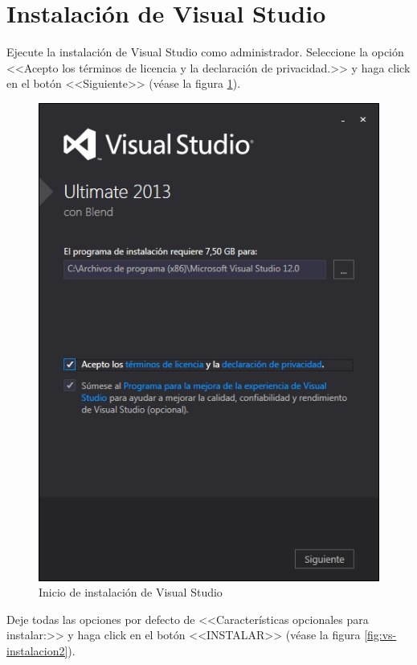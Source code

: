 \newpage

\section{Instalaci\'{o}n de Visual Studio}
	
Ejecute la instalaci\'{o}n de Visual Studio como administrador. Seleccione la opci\'{o}n <<Acepto los t\'{e}rminos de licencia y la declaraci\'{o}n de privacidad.>> y haga click en el bot\'{o}n <<Siguiente>> (v\'{e}ase la figura \ref{fig:vs-instalacion1}).

\begin{figure}[H]
  \centering
  \includegraphics[width=.8\linewidth]{./img/vs-instalacion1.jpg}
\caption[Inicio de instalaci\'{o}n de Visual Studio]{Inicio de instalaci\'{o}n de Visual Studio\label{fig:vs-instalacion1}}
\end{figure}
\newpage
Deje todas las opciones por defecto de <<Caracter\'{i}sticas opcionales para instalar:>> y haga click en el bot\'{o}n <<INSTALAR>> (v\'{e}ase la figura \ref{fig:vs-instalacion2}).	

